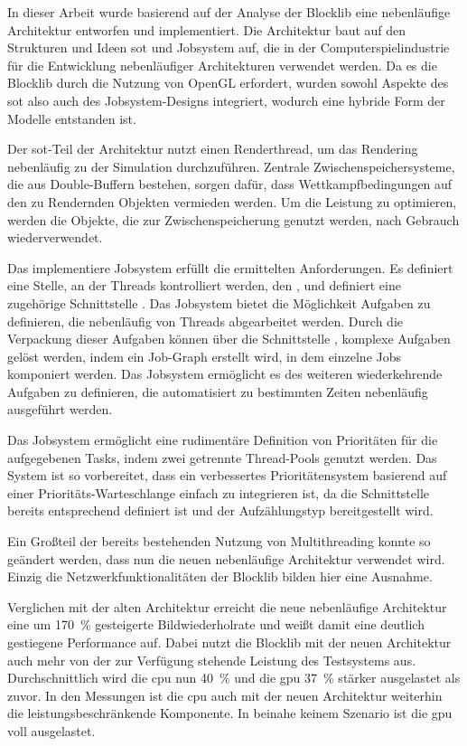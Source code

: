 In dieser Arbeit wurde basierend auf der Analyse der Blocklib eine nebenläufige Architektur entworfen und implementiert. Die Architektur baut auf den Strukturen und Ideen \acf{sot} und Jobsystem auf, die in der Computerspielindustrie für die Entwicklung nebenläufiger Architekturen verwendet werden. Da es die Blocklib durch die Nutzung von OpenGL erfordert, wurden sowohl Aspekte des \ac{sot} also auch des Jobsystem-Designs integriert, wodurch eine hybride Form der Modelle entstanden ist.

Der \ac{sot}-Teil der Architektur nutzt einen Renderthread, um das Rendering nebenläufig zu der Simulation durchzuführen. Zentrale Zwischenspeichersysteme, die aus Double-Buffern bestehen, sorgen dafür, dass Wettkampfbedingungen auf den zu Rendernden Objekten vermieden werden. Um die Leistung zu optimieren, werden die Objekte, die zur Zwischenspeicherung genutzt werden, nach Gebrauch wiederverwendet.

Das implementiere Jobsystem erfüllt die ermittelten Anforderungen. Es definiert eine Stelle, an der Threads kontrolliert werden, den , und definiert eine zugehörige Schnittstelle . Das Jobsystem bietet die Möglichkeit Aufgaben zu definieren, die nebenläufig von Threads abgearbeitet werden. Durch die Verpackung dieser Aufgaben können über die Schnittstelle , komplexe Aufgaben gelöst werden, indem ein Job-Graph erstellt wird, in dem einzelne Jobs komponiert werden. Das Jobsystem ermöglicht es des weiteren wiederkehrende Aufgaben zu definieren, die automatisiert zu bestimmten Zeiten nebenläufig ausgeführt werden.

Das Jobsystem ermöglicht eine rudimentäre Definition von Prioritäten für die aufgegebenen Tasks, indem zwei getrennte Thread-Pools genutzt werden. Das System ist so vorbereitet, dass ein verbessertes Prioritätensystem basierend auf einer Prioritäts-Warteschlange einfach zu integrieren ist, da die Schnittstelle  bereits entsprechend definiert ist und der Aufzählungstyp  bereitgestellt wird.

Ein Großteil der bereits bestehenden Nutzung von Multithreading konnte so geändert werden, dass nun die neuen nebenläufige Architektur verwendet wird. Einzig die Netzwerkfunktionalitäten der Blocklib bilden hier eine Ausnahme.

Verglichen mit der alten Architektur erreicht die neue nebenläufige Architektur eine um \SI{170}{\percent} gesteigerte Bildwiederholrate und weißt damit eine deutlich gestiegene Performance auf. Dabei nutzt die Blocklib mit der neuen Architektur auch mehr von der zur Verfügung stehende Leistung des Testsystems aus. Durchschnittlich wird die \ac{cpu} nun \SI{40}{\percent} und die \ac{gpu} \SI{37}{\percent} stärker ausgelastet als zuvor. In den Messungen ist die \ac{cpu} auch mit der neuen Architektur weiterhin die leistungsbeschränkende Komponente. In beinahe keinem Szenario ist die \ac{gpu} voll ausgelastet.